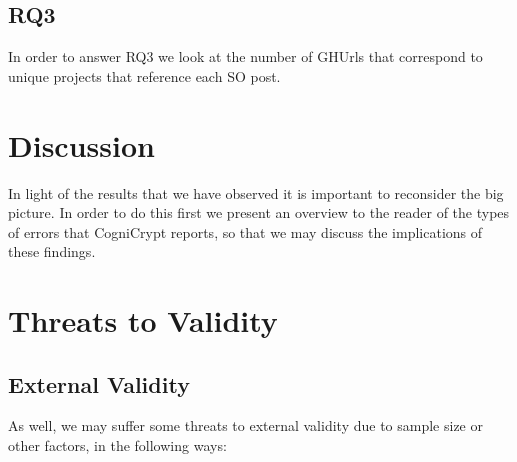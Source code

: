 \documentclass[10pt, conference]{IEEEtran}
\begin{document}
\subsection{RQ3}

In order to answer RQ3 we look at the number of GHUrls that correspond to unique projects that reference each SO post. 


\section{Discussion}

In light of the results that we have observed it is important to reconsider the big picture. In order to do this first we present an overview to the reader of the types of errors that CogniCrypt reports, so that we may discuss the implications of these findings.

\section{Threats to Validity}

\subsection{External Validity}
As well, we may suffer some threats to external validity due to sample size or other factors, in the  following ways:
\end{document}
